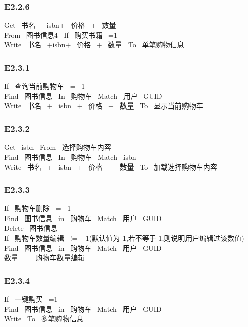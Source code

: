 \documentclass{article}
\begin{document}
\begin{CJK*}{UTF8}{gbsn}
\subsubsection*{E2.2.6}
Get \ 书名 \ +isbn+ \ 价格 \ + \ 数量\\ 
From \ 图书信息4 \ If \ 购买书籍 \ =1\\ 
Write \ 书名 \ +isbn+ \ 价格 \ + \ 数量 \ To \ 单笔购物信息\\ 
\vspace{-1mm}
\subsubsection*{E2.3.1}
If \ 查询当前购物车 \ = \ 1\\ 
Find \ 图书信息 \ In \ 购物车 \ Match \ 用户 \ GUID\\ 
Write \ 书名 \ + \ isbn \ + \ 价格 \ + \ 数量 \ To \ 显示当前购物车\\ 
\vspace{-1mm}
\subsubsection*{E2.3.2}
Get \ isbn \ From \ 选择购物车内容\\ 
Find \ 图书信息 \ In \ 购物车 \ Match \ isbn\\ 
Write \ 书名 \ + \ isbn \ + \ 价格 \ + \ 数量 \ To \ 加载选择购物车内容\\ 
\vspace{-1mm}
\subsubsection*{E2.3.3}
If \ 购物车删除 \ = \ 1\\ 
Find \ 图书信息 \ in \ 购物车 \ Match \ 用户 \ GUID\\ 
Delete \ 图书信息\\ 
If \ 购物车数量编辑 \ != \ -1(默认值为-1,若不等于-1,则说明用户编辑过该数值)\\ 
Find \ 图书信息 \ in \ 购物车 \ Match \ 用户 \ GUID \\ 
数量 \ = \ 购物车数量编辑\\ 
\vspace{-1mm}
\subsubsection*{E2.3.4}
If \ 一键购买 \ =1\\ 
Find \ 图书信息 \ in \ 购物车 \ Match \ 用户 \ GUID \\ 
Write \ To \ 多笔购物信息\\ 
\vspace{-1mm}

\end{CJK*}
\end{document}
